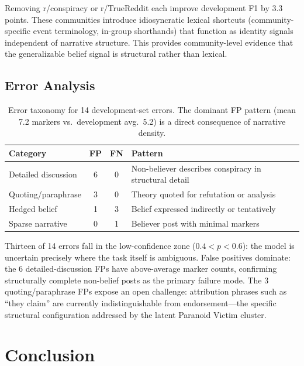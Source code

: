 \documentclass[11pt]{article}
\begin{document}
Removing r/conspiracy or r/TrueReddit each improve development F1 by
3.3 points.
These communities introduce idiosyncratic lexical shortcuts (community-specific
event terminology, in-group shorthands) that function as identity signals
independent of narrative structure.
This provides community-level evidence that the generalizable belief
signal is structural rather than lexical.

\subsection{Error Analysis}

\begin{table}[t]
\centering\small
\setlength{\tabcolsep}{4pt}
\begin{tabular}{@{}p{2.4cm}ccp{3.2cm}@{}}
\toprule
\textbf{Category} & \textbf{FP} & \textbf{FN} & \textbf{Pattern} \\
\midrule
Detailed discussion & 6 & 0 & Non-believer describes conspiracy in structural detail \\
Quoting/paraphrase  & 3 & 0 & Theory quoted for refutation or analysis \\
Hedged belief       & 1 & 3 & Belief expressed indirectly or tentatively \\
Sparse narrative    & 0 & 1 & Believer post with minimal markers \\
\bottomrule
\end{tabular}
\caption{Error taxonomy for 14 development-set errors.
The dominant FP pattern (mean 7.2 markers vs.\ development avg.\ 5.2)
is a direct consequence of narrative density.}
\label{tab:errors}
\end{table}

Thirteen of 14 errors fall in the low-confidence zone ($0.4 < p < 0.6$):
the model is uncertain precisely where the task itself is ambiguous.
False positives dominate: the 6 detailed-discussion FPs have
above-average marker counts, confirming structurally complete
non-belief posts as the primary failure mode.
The 3 quoting/paraphrase FPs expose an open challenge: attribution
phrases such as ``they claim'' are currently indistinguishable from
endorsement---the specific structural configuration addressed by the
latent Paranoid Victim cluster.

\section{Conclusion}
\label{sec:conclusion}
\end{document}

